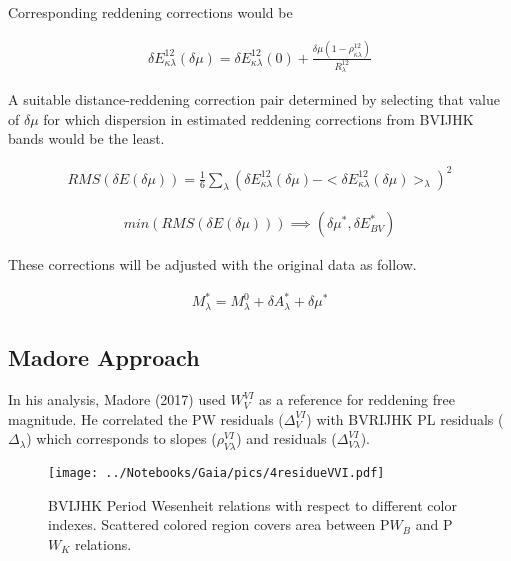\documentclass[12pt,a4paper]{article}
\begin{document}
Corresponding reddening corrections would be 


 {\begin{align*}
     \delta E_{\kappa \lambda}^{12} (\delta \mu) = \delta E_{\kappa \lambda}^{12} (0) + \frac{\delta \mu( 1 - \rho_{\kappa \lambda}^{12} )}{R_{\lambda}^{12}}
 \end{align*}}

A suitable distance-reddening correction pair determined by selecting that value of $\delta \mu$ for which dispersion in estimated reddening corrections from BVIJHK bands would be the least. 

\begin{align*}
    RMS(\delta E (\delta \mu)) = \frac{1}{6}\sum_{\lambda} (\delta E_{\kappa \lambda}^{12} (\delta \mu) - <\delta E_{\kappa \lambda}^{12} (\delta \mu)>_\lambda)^2
\end{align*}

\begin{align*}
    min(RMS(\delta E (\delta \mu))) \implies (\delta \mu^*, \delta E^*_{BV})
\end{align*}

These corrections will be adjusted with the original data as follow. 


\begin{align*}
    M_\lambda^* = M_\lambda^0 + \delta A_\lambda^* + \delta \mu^*
\end{align*}

\subsection{Madore Approach}

In his analysis, Madore (2017) used $W_V^{VI}$ as a reference for reddening free magnitude. He correlated the PW residuals ($\Delta_V^{VI}$) 
with BVRIJHK PL residuals ($\Delta_\lambda$) which corresponds to slopes ($\rho_{V \lambda}^{VI}$) and residuals ($\Delta^{VI}_{V \lambda }$). 

\begin{figure}
	\centering
	\vspace{-3.5cm}
	\texttt{[image: ../Notebooks/Gaia/pics/4residueVVI.pdf]}  
	\label{fig:del_delM}
	\caption{\small BVIJHK Period Wesenheit relations with respect to different color indexes. Scattered colored region covers area between P$W_B$ and P$W_K$ relations. }
\end{figure} 
\end{document}
